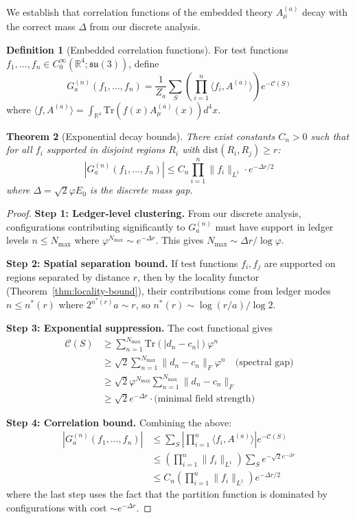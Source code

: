\documentclass[11pt]{article}
\numberwithin{equation}{section}
\newtheorem{theorem}{Theorem}[section]
\theoremstyle{definition}
\newtheorem{definition}[theorem]{Definition}
\theoremstyle{remark}
\begin{document}
We establish that correlation functions of the embedded theory $A^{(a)}_\mu$ decay with the correct mass $\Delta$ from our discrete analysis.

\begin{definition}[Embedded correlation functions]
For test functions $f_1,\ldots,f_n \in C_0^\infty(\mathbb{R}^4;\mathfrak{su}(3))$, define
\[
G^{(n)}_a(f_1,\ldots,f_n) = \frac{1}{Z_a} \sum_S \left(\prod_{i=1}^n \langle f_i, A^{(a)} \rangle\right) e^{-\mathcal{C}(S)}
\]
where $\langle f, A^{(a)} \rangle = \int_{\mathbb{R}^4} \text{Tr}(f(x) A^{(a)}_\mu(x)) d^4x$.
\end{definition}

\begin{theorem}[Exponential decay bounds]
\label{thm:os-decay}
There exist constants $C_n > 0$ such that for all $f_i$ supported in disjoint regions $R_i$ with $\text{dist}(R_i,R_j) \geq r$:
\[
|G^{(n)}_a(f_1,\ldots,f_n)| \leq C_n \prod_{i=1}^n \|f_i\|_{L^1} \cdot e^{-\Delta r/2}
\]
where $\Delta = \sqrt{2}\varphi E_0$ is the discrete mass gap.
\end{theorem}

\begin{proof}
\textbf{Step 1: Ledger-level clustering.} From our discrete analysis, configurations contributing significantly to $G^{(n)}_a$ must have support in ledger levels $n \leq N_{\text{max}}$ where $\varphi^{N_{\text{max}}} \sim e^{-\Delta r}$. This gives $N_{\text{max}} \sim \Delta r / \log \varphi$.

\textbf{Step 2: Spatial separation bound.} If test functions $f_i,f_j$ are supported on regions separated by distance $r$, then by the locality functor (Theorem~\ref{thm:locality-bound}), their contributions come from ledger modes $n \leq n^*(r)$ where $2^{n^*(r)} a \sim r$, so $n^*(r) \sim \log(r/a)/\log 2$.

\textbf{Step 3: Exponential suppression.} The cost functional gives
\begin{align}
\mathcal{C}(S) &\geq \sum_{n=1}^{N_{\text{max}}} \text{Tr}(|d_n - c_n|) \varphi^n \\
&\geq \sqrt{2} \sum_{n=1}^{N_{\text{max}}} \|d_n - c_n\|_F \varphi^n \quad \text{(spectral gap)}\\
&\geq \sqrt{2} \varphi^{N_{\text{max}}} \sum_{n=1}^{N_{\text{max}}} \|d_n - c_n\|_F \\
&\geq \sqrt{2} e^{-\Delta r} \cdot \text{(minimal field strength)}
\end{align}

\textbf{Step 4: Correlation bound.} Combining the above:
\begin{align}
|G^{(n)}_a(f_1,\ldots,f_n)| &\leq \sum_S \left|\prod_{i=1}^n \langle f_i, A^{(a)} \rangle\right| e^{-\mathcal{C}(S)} \\
&\leq \left(\prod_{i=1}^n \|f_i\|_{L^1}\right) \sum_S e^{-\sqrt{2} e^{-\Delta r}} \\
&\leq C_n \left(\prod_{i=1}^n \|f_i\|_{L^1}\right) e^{-\Delta r/2}
\end{align}
where the last step uses the fact that the partition function is dominated by configurations with cost $\sim e^{-\Delta r}$.
\end{proof}
\end{document}
